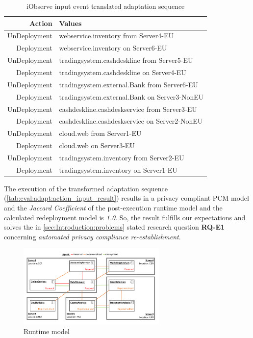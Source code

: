\begin{table}[h]
	\centering
	\begin{tabular}{r | l}
		\hline
		\textbf{Action} & \textbf{Values}\\
		\hline
		UnDeployment & webservice.inventory from Server4-EU\\
		Deployment & webservice.inventory on Server6-EU\\
		
		UnDeployment & tradingsystem.cashdeskline from Server5-EU\\
		Deployment & tradingsystem.cashdeskline on Server4-EU\\
		
		UnDeployment & tradingsystem.external.Bank from Server6-EU\\
		Deployment & tradingsystem.external.Bank on Server3-NonEU\\
		
		UnDeployment & cashdeskline.cashdeskservice from Server3-EU\\
		Deployment & cashdeskline.cashdeskservice on Server2-NonEU\\
		
		UnDeployment & cloud.web from Server1-EU\\
		Deployment & cloud.web on Server3-EU\\
		
		UnDeployment & tradingsystem.inventory from Server2-EU\\
		Deployment & tradingsystem.inventory on Server1-EU\\
		\hline
	\end{tabular}
	\caption{iObserve input event translated adaptation sequence}
	\label{tab:eval:adapt:action_input_result}
\end{table}


The execution of the transformed adaptation sequence (\autoref{tab:eval:adapt:action_input_result}) results in a privacy compliant PCM model and the \textit{Jaccard Coefficient} of the post-execution runtime model and the calculated redeployment model is \textit{1.0}. So, the result fulfills our expectations and solves the in \autoref{sec:Introduction:problems} stated research question \textbf{RQ-E1} concerning \textit{automated privacy compliance re-establishment}.

\begin{figure}[h]
	\centering
	\includegraphics[trim = 5mm 10mm 10mm 10mm, clip, width=0.65\textwidth]{graphs/medSystem_adap_calc_all_runtime}
	\caption{Runtime model}
	\label{fig:eval:adapt:4:run}
\end{figure}


